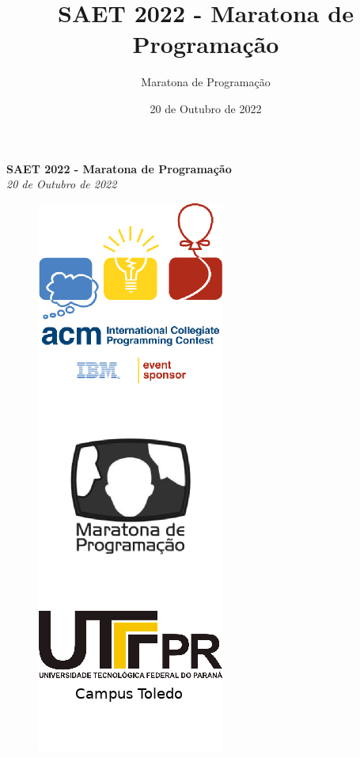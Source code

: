 \documentclass[12pt,oneside]{article} %
\title{SAET 2022 - Maratona de Programação}
\author{Maratona de Programação}
\date{20 de Outubro de 2022}
\begin{document}
\begin{center}
\textbf{\Huge SAET 2022 - Maratona de Programação} \\
\vspace{0.2cm}
\textit{20 de Outubro de 2022} \\
\vspace{1.0cm}
\begin{figure}[h!]
	\centering
 \includegraphics[scale=0.95]{capa.png}
\end{figure}
\vspace{1.0cm}
\vspace{1.0cm}
\end{center}
\end{document}
